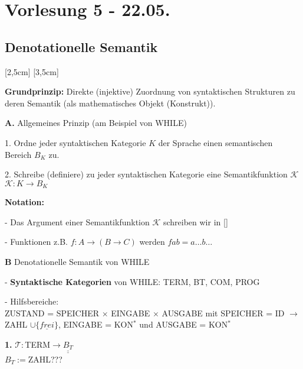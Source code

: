\section{Vorlesung 5 - 22.05.}
\subsection{Denotationelle Semantik}
[2,5cm]
[3,5cm]

\textbf{Grundprinzip:} Direkte (injektive) Zuordnung von syntaktischen Strukturen zu deren Semantik (als mathematisches Objekt (Konstrukt)).

\begin{compactitem}
	\item[\textbf{A.}] Allgemeines Prinzip (am Beispiel von WHILE)
	\begin{compactitem}
		\item[1.] Ordne jeder syntaktischen Kategorie $K$ der Sprache einen semantischen Bereich $B_K$ zu.
		\item[2.] Schreibe (definiere) zu jeder syntaktischen Kategorie eine Semantikfunktion $\mathcal{K}$\\
		$\mathcal{K}:K \rightarrow B_K$
	\end{compactitem}
	\textbf{Notation:}
	\begin{compactitem}
		\item[-] Das Argument einer Semantikfunktion $\mathcal{K}$ schreiben wir in []
		\item[-] Funktionen z.B. $f: A \rightarrow (B \rightarrow C)$ werden $f a b = a \dots b \dots $ 
	\end{compactitem}
	\item[\textbf{B}] Denotationelle Semantik von WHILE
	\begin{compactitem}
		\item[-] \textbf{Syntaktische Kategorien} von WHILE: TERM, BT, COM, PROG
		\item[-] Hilfsbereiche:\\
		ZUSTAND = SPEICHER $\times$ EINGABE $\times$ AUSGABE mit SPEICHER = ID $\rightarrow$ ZAHL $\cup \{\underline{frei}\}$, EINGABE = KON$^*$ und AUSGABE = KON$^*$
		\item[\textbf{1.}] $\mathcal{T}:$TERM$\rightarrow \underline{\underline{B_T}}$\\
		$B_T :=$ZAHL???
		\begin{compactitem}

\end{compactitem}
\end{compactitem}
\end{compactitem}

